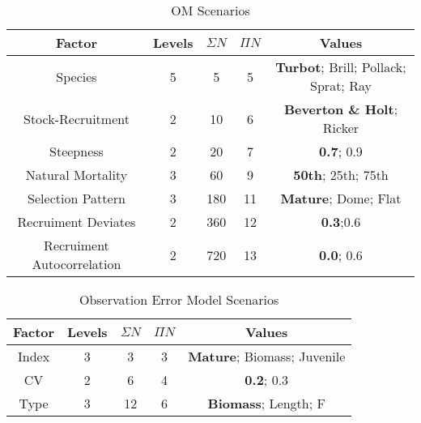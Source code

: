 \documentclass[]{article}
\begin{document}
\begin{table}
\begin{center}
\begin{tabular}{|ccccc|}
\hline
{\tiny Factor} & {\tiny Levels} & {\tiny $\Sigma N$} & {\tiny $\Pi N$} & {\tiny Values} \\
\hline\hline
{\tiny Species} 			& {\tiny 5}   & {\tiny 5}  	& {\tiny 5} & {\tiny  \textbf{Turbot}; Brill; Pollack; Sprat; Ray}      \\
{\tiny Stock-Recruitment} 		& {\tiny 2}   & {\tiny 10}  	& {\tiny 6} & {\tiny  \textbf{Beverton \& Holt}; Ricker}		\\
{\tiny Steepness} 			& {\tiny 2}   & {\tiny 20} 	& {\tiny 7} & {\tiny  \textbf{0.7}; 0.9}     	           		\\
{\tiny Natural Mortality}		& {\tiny 3}   & {\tiny 60} 	& {\tiny 9} & {\tiny  \textbf{50th}; 25th; 75th} 			\\
{\tiny Selection Pattern}		& {\tiny 3}   & {\tiny 180} 	& {\tiny 11}& {\tiny  \textbf{Mature}; Dome; Flat}			\\
{\tiny Recruiment Deviates}		& {\tiny 2}   & {\tiny 360} 	& {\tiny 12}& {\tiny  \textbf{0.3};0.6}					\\
{\tiny Recruiment Autocorrelation}	& {\tiny 2}   & {\tiny 720} 	& {\tiny 13}& {\tiny  \textbf{0.0}; 0.6}				\\
\hline
\end{tabular}
\end{center}
\caption{OM Scenarios}
\label{tab:om}
\end{table}

\begin{table}
\begin{center}
\begin{tabular}{|ccccc|}
\hline
{\tiny Factor} & {\tiny Levels} & {\tiny $\Sigma N$} & {\tiny $\Pi N$} & {\tiny Values} \\
\hline\hline
{\tiny Index} 				& {\tiny 3}   & {\tiny 3}  	& {\tiny 3} & {\tiny  \textbf{Mature}; Biomass; Juvenile}      		\\
{\tiny CV} 				& {\tiny 2}   & {\tiny 6}  	& {\tiny 4} & {\tiny  \textbf{0.2}; 0.3}				\\
{\tiny Type} 				& {\tiny 3}   & {\tiny 12} 	& {\tiny 6} & {\tiny  \textbf{Biomass}; Length; F}            		\\
\hline
\end{tabular}
\end{center}
\caption{Observation Error Model Scenarios}
\label{tab:oem}
\end{table}
\end{document}
